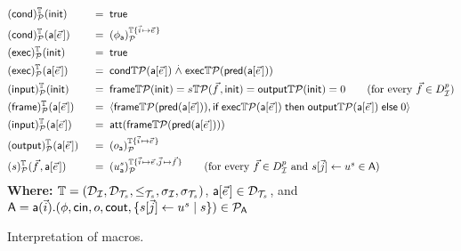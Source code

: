 \begin{figure}[t]
  \begin{alignat*}{2}
    &\interp{\mcond}{\TM}{\calp}(\tinit) &\;\;=\;\;& \true
    \\
    &\interp{\mcond}{\TM}{\calp}(\sfa[\pvec{e}]) &\;\;=\;\;&
    \interp{\phi_{\sfa}}{\TM\{\pvec{i} \mapsto \pvec{e}\}}{\calp}
    \\
    &\interp{\mexec}{\TM}{\calp}(\tinit) &\;\;=\;\;& \true
    \\
    &\interp{\mexec}{\TM}{\calp}(\sfa[\pvec{e}]) &\;\;=\;\;&
    \mcond{\TM}{\calp}(\sfa[\pvec{e}])
    \dand
    \mexec{\TM}{\calp}(\tpred{\sfa[\pvec{e}]})
    \\
    &\interp{\minp}{\TM}{\calp}(\tinit) &\;\;=\;\;& \mframe{\TM}{\calp}(\tinit) = s{\TM}{\calp}(\pvec{f},\tinit)
    = \mout{\TM}{\calp}(\tinit) = 0
    \tag{for every $\vec{f} \in D_\I^p$}
    \\
    &\interp{\mframe}{\TM}{\calp}(\sfa[\pvec{e}]) &\;\;=\;\;&
    \langle \mframe{\TM}{\calp}(\tpred{\sfa[\pvec{e}]}),
    \myif \mexec{\TM}{\calp}(\sfa[\pvec{e}]) \mythen \mout{\TM}{\calp}(\sfa[\pvec{e}]) \myelse 0
    \rangle
    \\
    &\interp{\minp}{\TM}{\calp}(\sfa[\pvec{e}]) &\;\;=\;\;&
    \att(\mframe{\TM}{\calp}(\tpred{\sfa[\pvec{e}]}))
    \\
    &\interp{\mout}{\TM}{\calp}(\sfa[\pvec{e}]) &\;\;=\;\;&
    \interp{o_{\sfa}}{\TM\{\pvec{i}\mapsto\pvec{e}\}}{\calp}
    \\
    &\interp{s}{\TM}{\calp}(\pvec{f},\sfa[\pvec{e}]) &\;\;=\;\;&
    \interp{u_{\sfa}^{s}}
    {\TM\{\pvec{i}\mapsto\pvec{e},\pvec{j}\mapsto\pvec{f}\}}{\calp}
    \tag{for every $\vec{f} \in D_\I^p$ and $s[\vec{j}] \leftarrow u^{s} \in \sfA$}
  \end{alignat*}
  \textbf{Where:} $\mathbb{T} = (\mathcal{D}_{\mathcal{I}}, \mathcal{D}_{\mathcal{T}_s}, \leq_{\mathcal{T}_s}, \sigma_{\mathcal{I}}, \sigma_{\mathcal{T}_s})$, $\sfa[\pvec{e}] \in \D_\XT$, and
  \(
    \textsf{A} = \textsf{a}(\vec{i}).(\phi, \mathsf{cin}, o, \mathsf{cout},
    \{s[\vec{j}] \leftarrow u^{s} \mid s\})
    \in \mathcal{P}_{\textsf{A}}
  \)
  \caption{Interpretation of macros.}
  \label{fig:inter-macros}
\end{figure}


